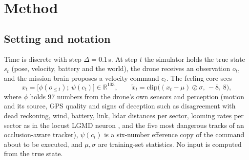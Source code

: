 \documentclass[10pt]{article}
\begin{document}
\section{Method}\label{sec:method}
\subsection{Setting and notation}
Time is discrete with step $\Delta=0.1$\,s. At step $t$ the simulator holds the true state $s_t$ (pose, velocity, battery and the
world), the drone receives an observation $o_t$, and the mission brain proposes a velocity command $c_t$. The feeling core sees
\begin{equation}
x_t=\big[\phi(o_{\le t});\ \psi(c_t)\big]\in\mathbb{R}^{103},\qquad \tilde x_t=\mathrm{clip}\big((x_t-\mu)\oslash\sigma,\,-8,\,8\big),
\end{equation}
where $\phi$ holds 97 numbers from the drone's own sensors and perception (motion and its source, GPS quality and signs of
deception such as disagreement with dead reckoning, wind, battery, link, lidar distances per sector, looming rates per sector as in
the locust LGMD neuron \citep{gabbiani2002}, and the five most dangerous tracks of an occlusion-aware tracker), $\psi(c_t)$ is a
six-number efference copy \citep{vonholst1950} of the command about to be executed, and $\mu,\sigma$ are training-set statistics. No input is computed
from the true state.
\end{document}
